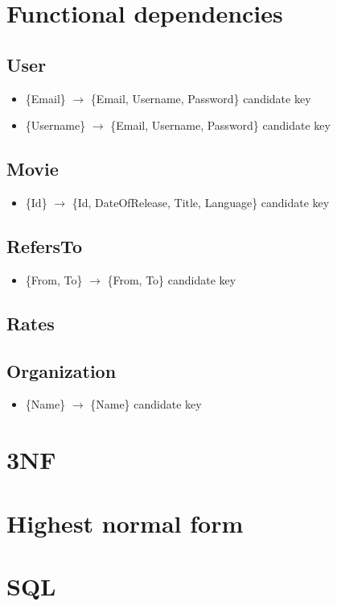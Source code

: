 \section{Functional dependencies}

\subsection*{User}
\begin{itemize}
\item{\{Email\} $\rightarrow$ \{Email, Username, Password\}} candidate key
\item{\{Username\} $\rightarrow$ \{Email, Username, Password\} candidate key}
\end{itemize}

\subsection*{Movie}
\begin{itemize}
\item{\{Id\} $\rightarrow$ \{Id, DateOfRelease, Title, Language\} candidate key}
\end{itemize}

\subsection*{RefersTo}
\begin{itemize}
\item{\{From, To\} $\rightarrow$ \{From, To\} candidate key}
\end{itemize}

\subsection*{Rates}

\subsection*{Organization}
\begin{itemize}
\item{\{Name\} $\rightarrow$ \{Name\} candidate key}
\end{itemize}

\section{3NF}

\section{Highest normal form}

\section{SQL}